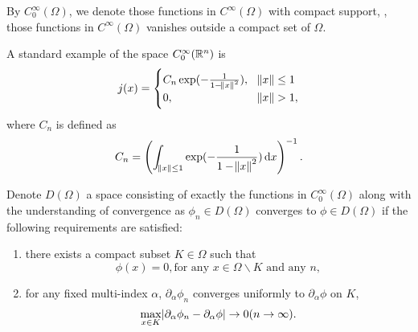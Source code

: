 By $C^{\infty} _0(\Omega)$, we denote those functions in $C^\infty(\Omega)$ 
with compact support, \ie, those functions in $C^\infty(\Omega)$ vanishes 
outside a compact set of $\Omega$.

\begin{example}
A standard example of the space $C^{\infty} _0(\mathbb{R} ^n)$ is 
\begin{equation}
    j(x) = \begin{cases}
        C_n \exp( - \frac{1}{1-\norm{x}^2 }) , & \norm{x} \le 1 \\
        0, & \norm{x} > 1, 
    \end{cases}
\end{equation}
where $C_n$ is defined as
\begin{equation}
    C_n = \left(\int _{\norm{x} \le 1} \exp(-\frac{1}{1 - \norm{x}^2})\mathop{}\!\mathrm{d} 
    x\right) ^{-1}.
\end{equation}
\end{example}

\begin{defn}
Denote $D(\Omega)$ a space consisting of exactly the functions in 
$C_0^\infty(\Omega)$ along with the understanding of convergence as $\phi_n
\in D(\Omega)$ converges to $\phi \in D(\Omega)$ if the following 
requirements are satisfied:
\begin{enumerate}
    \item there exists a compact subset $K \in \Omega$ such that 
    \begin{equation}
        \phi(x) = 0, \text{for any } x \in \Omega \backslash K \text{ and 
        any } n, 
    \end{equation}
    \item for any fixed multi-index $\alpha$, $\partial _\alpha \phi_n$ 
    converges uniformly to $\partial _\alpha \phi$ on $K$, \ie
    \begin{equation}
        \max _{x\in K} \abs{\partial _\alpha \phi _n - \partial _\alpha \phi}
        \to 0 (n \to \infty).
    \end{equation}

\end{enumerate}
\end{defn}
